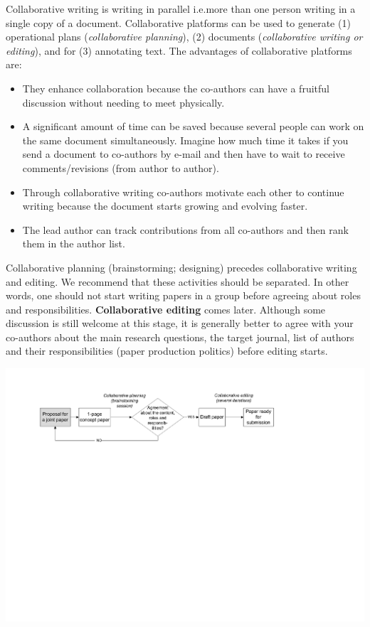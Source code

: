 \documentclass[graybox,envcountchap,sectrefs,UStrade]{svmono}
\begin{document}
Collaborative writing is writing in parallel i.e.\@ more than one person writing in a single copy of a document. Collaborative platforms can be used to generate (1) operational plans (\emph{collaborative planning}), (2) documents (\emph{collaborative writing or editing}), and for (3) annotating text. The advantages of collaborative platforms are:

\begin{itemize}
  \item They enhance collaboration because the co-authors can have a fruitful discussion without needing to meet physically.
  \item A significant amount of time can be saved because several people can work on the same document simultaneously. Imagine how much time it takes if you send a document to co-authors by e-mail and then have to wait to receive comments/revisions (from author to author).
  \item Through collaborative writing co-authors motivate each other to continue writing because the document starts growing and evolving faster.
  \item The lead author can track contributions from all co-authors and then rank them in the author list.
\end{itemize}

Collaborative planning (brainstorming; designing) precedes collaborative writing and editing. We recommend that these activities should be separated. In other words, one should not start writing papers in a group before agreeing about roles and responsibilities. \textbf{Collaborative editing} comes later. Although some discussion is still welcome at this stage, it is generally better to agree with your co-authors about the main research questions, the target journal, list of authors and their responsibilities (paper production politics) before editing starts. \par

\begin{center}
  \includegraphics[width=\textwidth]{Fig_collaborative_editing_phases.pdf}
\end{center}
\end{document}

